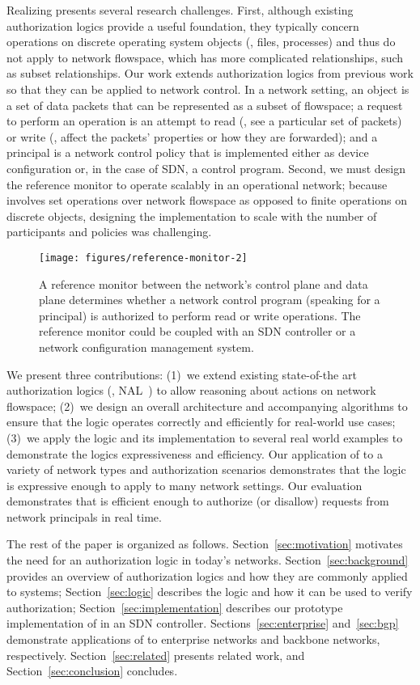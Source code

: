 Realizing \name{} presents several research challenges.  First, although
existing authorization logics provide a useful foundation, they
typically concern operations on discrete operating system objects (\eg,
files, processes) and thus do not apply to network flowspace, which has
more complicated relationships, such as subset relationships.  Our work
extends authorization logics from previous work so that they can be
applied to network control. In a network setting, an object is a set of
data packets that can be represented as a subset of flowspace; a request
to perform an operation is an attempt to read (\ie, see a particular set
of packets) or write (\ie, affect the packets' properties or how they
are forwarded); and a principal is a network control policy that is
implemented either as device configuration or, in the case of SDN, a
control program.
Second, we must design the reference monitor to
operate scalably in an operational network; because
\name{} involves set operations over network flowspace as opposed to
finite operations on discrete objects, designing the implementation to
scale with the number of participants and policies was challenging.


\begin{figure}[t!]
  \centering
\texttt{[image: figures/reference-monitor-2]}
\caption{A reference monitor between the network's control plane and
  data plane determines whether a network control program (speaking for
  a principal) is authorized to perform read or write operations. The
  reference monitor could be coupled with an SDN controller or a network
configuration management system.}
\label{fig:reference-monitor}
\end{figure}

We present three contributions: (1)~we extend existing
state-of-the art authorization logics (\eg, NAL~\cite{nexus}) to allow
reasoning about actions on network flowspace; (2)~we design an overall
architecture and accompanying algorithms to ensure that the logic
operates correctly and efficiently for real-world use cases; (3)~we
apply the logic and its implementation to several real world examples to
demonstrate the logics expressiveness and efficiency.  Our application
of \name{} to a variety of network types and authorization scenarios
demonstrates that the logic is expressive enough to apply to many
network settings.  Our evaluation demonstrates that \name{} is efficient
enough to authorize (or disallow) requests from network principals in
real time.

The rest of the paper is organized as follows.
Section~\ref{sec:motivation} motivates the need for an authorization
logic in today's networks. Section~\ref{sec:background} provides an overview of authorization
logics and how they are commonly applied to systems; 
Section~\ref{sec:logic} describes
the logic and how it can be used to verify authorization;
Section~\ref{sec:implementation} describes our prototype implementation
of \name{} in an SDN controller.  Sections~\ref{sec:enterprise}
and~\ref{sec:bgp} demonstrate applications of \name{} to enterprise
networks and backbone networks, respectively. Section~\ref{sec:related}
presents related work, and Section~\ref{sec:conclusion} concludes.